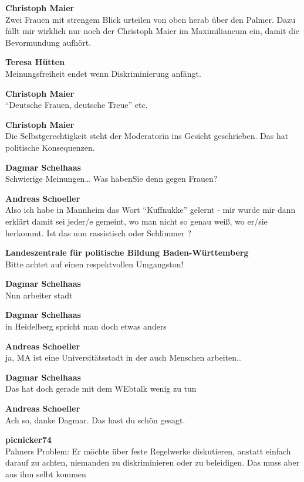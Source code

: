\documentclass[a4,parindent=0pt]{article}
\begin{document}
\textbf{Christoph Maier}\\
Zwei Frauen mit strengem Blick urteilen von oben herab über den Palmer.
Dazu fällt mir wirklich nur noch der
Christoph Maier\cite{christophmaiermdl} im
Maximilianeum\cite{maximilianeum} ein, damit die
Bevormundung aufhört.

\textbf{Teresa Hütten}\\
Meinungsfreiheit endet wenn Diskriminierung anfängt.

\textbf{Christoph Maier}\\
``Deutsche Frauen, deutsche
Treue'' etc.\cite{deutschefrauen}

\textbf{Christoph Maier}\\
Die Selbstgerechtigkeit steht der Moderatorin ins Gesicht geschrieben.
Das hat politische Konsequenzen.

\textbf{Dagmar Schelhaas}\\
Schwierige Meinungen\ldots{} Was habenSie denn gegen Frauen?

\textbf{Andreas Schoeller}\\
Also ich habe in Mannheim das Wort ``Kuffnukke'' gelernt - mir wurde
mir dann erklärt damit sei jeder/e gemeint, wo man nicht so genau weiß,
wo er/sie herkommt. Ist das nun rassistisch oder Schlimmer ?

\textbf{Landeszentrale für politische Bildung Baden-Württemberg}\\
Bitte achtet auf einen respektvollen Umgangston!

\textbf{Dagmar Schelhaas}\\
Nun arbeiter stadt

\textbf{Dagmar Schelhaas}\\
in Heidelberg spricht man doch etwas anders

\textbf{Andreas Schoeller}\\
ja, MA ist eine Universitätsstadt in der auch Menschen arbeiten..

\textbf{Dagmar Schelhaas}\\
Das hat doch gerade mit dem WEbtalk wenig zu tun

\textbf{Andreas Schoeller}\\
Ach so, danke Dagmar. Das hast du schön gesagt.

\textbf{picnicker74}\\
Palmers Problem: Er möchte über feste Regelwerke diskutieren, anstatt
einfach darauf zu achten, niemanden zu diskriminieren oder zu
beleidigen. Das muss aber aus ihm selbt kommen
\end{document}
